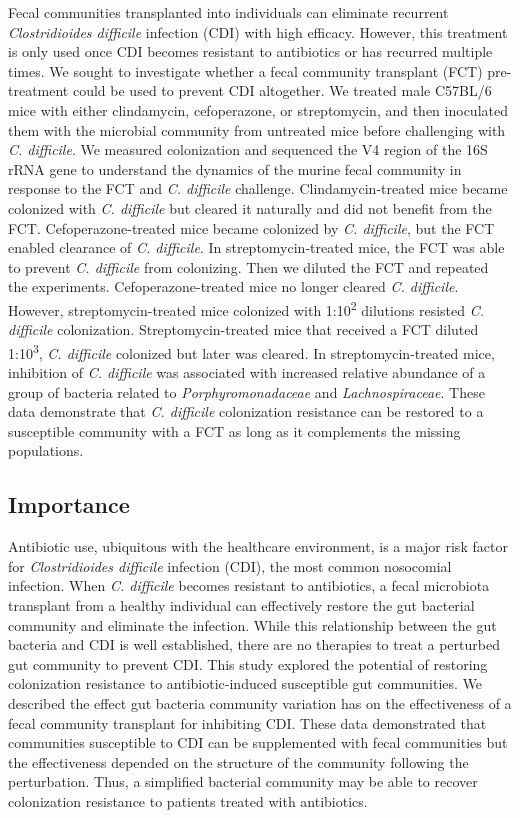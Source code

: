 \documentclass[
  12pt,
]{article}
\begin{document}
Fecal communities transplanted into individuals can eliminate recurrent
\emph{Clostridioides difficile} infection (CDI) with high efficacy.
However, this treatment is only used once CDI becomes resistant to
antibiotics or has recurred multiple times. We sought to investigate
whether a fecal community transplant (FCT) pre-treatment could be used
to prevent CDI altogether. We treated male C57BL/6 mice with either
clindamycin, cefoperazone, or streptomycin, and then inoculated them
with the microbial community from untreated mice before challenging with
\emph{C. difficile}. We measured colonization and sequenced the V4
region of the 16S rRNA gene to understand the dynamics of the murine
fecal community in response to the FCT and \emph{C. difficile}
challenge. Clindamycin-treated mice became colonized with \emph{C.
difficile} but cleared it naturally and did not benefit from the FCT.
Cefoperazone-treated mice became colonized by \emph{C. difficile}, but
the FCT enabled clearance of \emph{C. difficile}. In
streptomycin-treated mice, the FCT was able to prevent \emph{C.
difficile} from colonizing. Then we diluted the FCT and repeated the
experiments. Cefoperazone-treated mice no longer cleared \emph{C.
difficile}. However, streptomycin-treated mice colonized with
1:10\textsuperscript{2} dilutions resisted \emph{C. difficile}
colonization. Streptomycin-treated mice that received a FCT diluted
1:10\textsuperscript{3}, \emph{C. difficile} colonized but later was
cleared. In streptomycin-treated mice, inhibition of \emph{C. difficile}
was associated with increased relative abundance of a group of bacteria
related to \emph{Porphyromonadaceae} and \emph{Lachnospiraceae}. These
data demonstrate that \emph{C. difficile} colonization resistance can be
restored to a susceptible community with a FCT as long as it complements
the missing populations.

\hypertarget{importance}{%
\subsection{Importance}\label{importance}}

Antibiotic use, ubiquitous with the healthcare environment, is a major
risk factor for \emph{Clostridioides difficile} infection (CDI), the
most common nosocomial infection. When \emph{C. difficile} becomes
resistant to antibiotics, a fecal microbiota transplant from a healthy
individual can effectively restore the gut bacterial community and
eliminate the infection. While this relationship between the gut
bacteria and CDI is well established, there are no therapies to treat a
perturbed gut community to prevent CDI. This study explored the
potential of restoring colonization resistance to antibiotic-induced
susceptible gut communities. We described the effect gut bacteria
community variation has on the effectiveness of a fecal community
transplant for inhibiting CDI. These data demonstrated that communities
susceptible to CDI can be supplemented with fecal communities but the
effectiveness depended on the structure of the community following the
perturbation. Thus, a simplified bacterial community may be able to
recover colonization resistance to patients treated with antibiotics.
\end{document}
